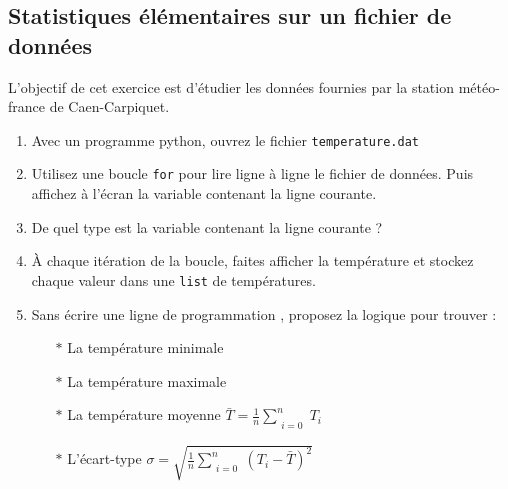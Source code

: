 

\subsection{Statistiques élémentaires sur un fichier de données}

L'objectif de cet exercice est d'étudier les données fournies par la station météo-france
de Caen-Carpiquet.
\begin{enumerate}
\item Avec un programme python, ouvrez le fichier \texttt{temperature.dat}

\item Utilisez une boucle \texttt{for} pour lire ligne à ligne le fichier de données.
  Puis affichez à l'écran la variable contenant la ligne courante.

\item De quel type est la variable contenant la ligne courante ?


\item À chaque itération de la boucle, faites afficher la température et stockez chaque valeur dans une \texttt{list} de températures.

\item Sans écrire une ligne de programmation , proposez la logique pour trouver :
  \begin{itemize}
  \item[$\ast$] La température minimale
  \item[$\ast$] La température maximale
  \item[$\ast$] La température moyenne    $ \bar{T}= \frac{1}{n}  \sum\limits_{\substack{i=0}}^{n}{T_i}$
  \item[$\ast$] L'écart-type  $\sigma = \sqrt{\frac{1}{n}  \sum\limits_{\substack{i=0}}^{n}{} (T_i-\bar{T})^2   }$
  \end{itemize}


\end{enumerate}
